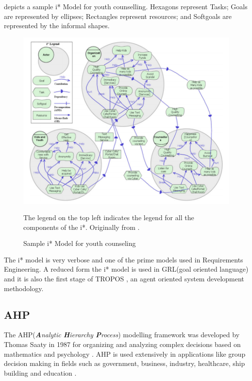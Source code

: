  depicts a sample i* Model for youth counselling. Hexagons represent Tasks; Goals are represented by ellipses; Rectangles represent resources; and Softgoals are represented by the informal shapes.

\begin{figure}[hbtp]
    \centering
    \includegraphics[width=\textwidth]{Chapter-2/figs/istar}
    \caption{Sample i* Model for youth counseling}
    \medskip
    \small
    The legend on the top left indicates the legend for all the components of the i*. Originally from \cite{horkoff12}.
    \label{fig:istar}
\end{figure}


The i* model is very verbose and one of the prime models used in Requirements Engineering. A reduced form the i* model is used in GRL(goal oriented language)\cite{amyot10} and it is also the first stage of TROPOS \cite{giorgini05}, an agent oriented system development methodology.

\subsection{AHP}
\label{subsec:bg:gm:ahp}

The AHP(\textit{\textbf{A}nalytic \textbf{H}ierarchy \textbf{P}rocess}) modelling framework was developed by Thomas Saaty in 1987 for organizing and analyzing complex decisions based on mathematics and psychology \cite{saaty87}. AHP is used extensively in applications like group decision making in fields such as government, business, industry, healthcare, ship building and education \cite{saracoglu13}.

